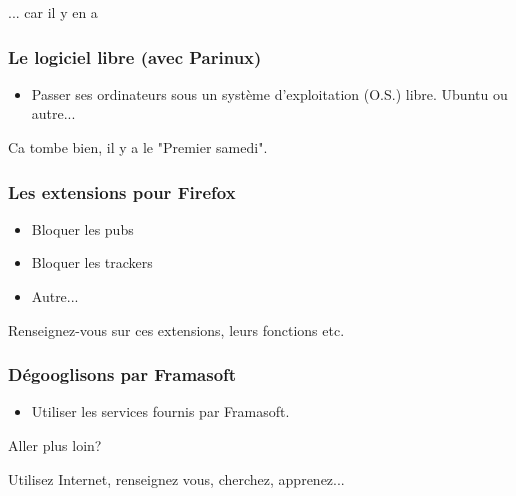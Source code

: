 \documentclass{beamer}
\begin{document}
\begin{frame}
\begin{center}
\Huge{... car il y en a}
\end{center}
\end{frame}

\begin{frame}
\frametitle{Le logiciel libre (avec Parinux)}
\begin{itemize}
\item Passer ses ordinateurs sous un système d'exploitation (O.S.) libre. Ubuntu ou autre...
\end{itemize}
Ca tombe bien, il y a le "Premier samedi".
\end{frame}

\begin{frame}
\frametitle{Les extensions pour Firefox}
\begin{itemize}
\item Bloquer les pubs
\item Bloquer les trackers
\item Autre...
\end{itemize}
Renseignez-vous sur ces extensions, leurs fonctions etc.
\end{frame}
\begin{frame}
\frametitle{Dégooglisons par Framasoft}
\begin{itemize}
\item Utiliser les services fournis par Framasoft.
\end{itemize}
\end{frame}

\begin{frame}
\begin{center}
\Huge{Aller plus loin?}
\end{center}
\end{frame}

\begin{frame}
\begin{center}
\Huge{Utilisez Internet, renseignez vous, cherchez, apprenez...}
\end{center}
\end{frame}
\end{document}
